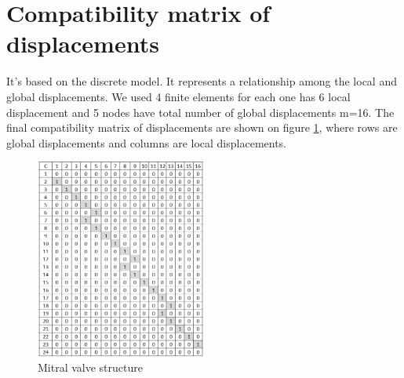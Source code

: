 \section*{Compatibility matrix of displacements}
It's based on the discrete model. It represents a relationship among the local
and global displacements. We used 4 finite elements for each one has 6 local
displacement and 5 nodes have total number of global displacements m=16. The
final compatibility matrix of displacements are shown on figure
\ref{fig:CDmatrix}, where rows are global displacements and columns are local
displacements.
\begin{figure}[H]
  \centering
  \includegraphics[width=0.5\textwidth]{./fig/CDmatrix.png}
    \caption{Mitral valve structure}
    \label{fig:CDmatrix}
\end{figure}